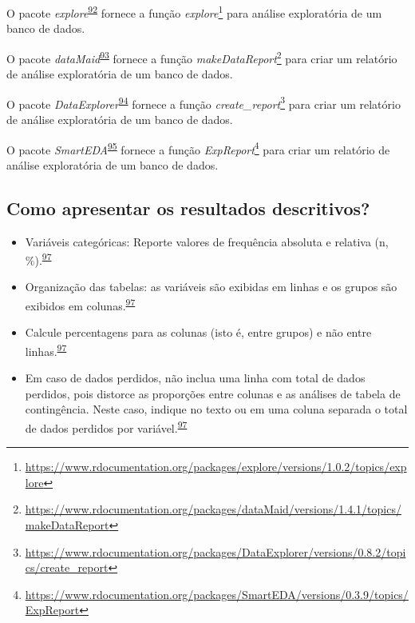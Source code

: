 \documentclass[
  a4paper,
]{book}
\renewcommand{\href}[2]{#2\footnote{\url{#1}}}
\newenvironment{infobox}[1]
  {
  \begin{itemize}
  \renewcommand{\labelitemi}{
    \raisebox{-.7\height}[0pt][0pt]{
      {\setkeys{Gin}{width=3em,keepaspectratio}
        \texttt{[image: \#1]}}
    }
  }
  \setlength{\fboxsep}{1em}
  \begin{blackbox}
  \item
  }
  {
  \end{blackbox}
  \end{itemize}
  }
\begin{document}
\begin{infobox}{images/Rlogo}
O pacote \emph{explore}\textsuperscript{\protect\hyperlink{ref-explore}{92}} fornece a função \href{https://www.rdocumentation.org/packages/explore/versions/1.0.2/topics/explore}{\emph{explore}} para análise exploratória de um banco de dados.

\end{infobox}

\begin{infobox}{images/Rlogo}
O pacote \emph{dataMaid}\textsuperscript{\protect\hyperlink{ref-dataMaid}{93}} fornece a função \href{https://www.rdocumentation.org/packages/dataMaid/versions/1.4.1/topics/makeDataReport}{\emph{makeDataReport}} para criar um relatório de análise exploratória de um banco de dados.

\end{infobox}

\begin{infobox}{images/Rlogo}
O pacote \emph{DataExplorer}\textsuperscript{\protect\hyperlink{ref-DataExplorer-2}{94}} fornece a função \href{https://www.rdocumentation.org/packages/DataExplorer/versions/0.8.2/topics/create_report}{\emph{create\_report}} para criar um relatório de análise exploratória de um banco de dados.

\end{infobox}

\begin{infobox}{images/Rlogo}
O pacote \emph{SmartEDA}\textsuperscript{\protect\hyperlink{ref-SmartEDA}{95}} fornece a função \href{https://www.rdocumentation.org/packages/SmartEDA/versions/0.3.9/topics/ExpReport}{\emph{ExpReport}} para criar um relatório de análise exploratória de um banco de dados.

\end{infobox}

\hypertarget{como-apresentar-os-resultados-descritivos}{%
\subsection{Como apresentar os resultados descritivos?}\label{como-apresentar-os-resultados-descritivos}}

\begin{itemize}
\item
  Variáveis categóricas: Reporte valores de frequência absoluta e relativa (n, \%).\textsuperscript{\protect\hyperlink{ref-Cummings2003}{97}}
\item
  Organização das tabelas: as variáveis são exibidas em linhas e os grupos são exibidos em colunas.\textsuperscript{\protect\hyperlink{ref-Cummings2003}{97}}
\item
  Calcule percentagens para as colunas (isto é, entre grupos) e não entre linhas.\textsuperscript{\protect\hyperlink{ref-Cummings2003}{97}}
\item
  Em caso de dados perdidos, não inclua uma linha com total de dados perdidos, pois distorce as proporções entre colunas e as análises de tabela de contingência. Neste caso, indique no texto ou em uma coluna separada o total de dados perdidos por variável.\textsuperscript{\protect\hyperlink{ref-Cummings2003}{97}}
\end{itemize}
\end{document}
